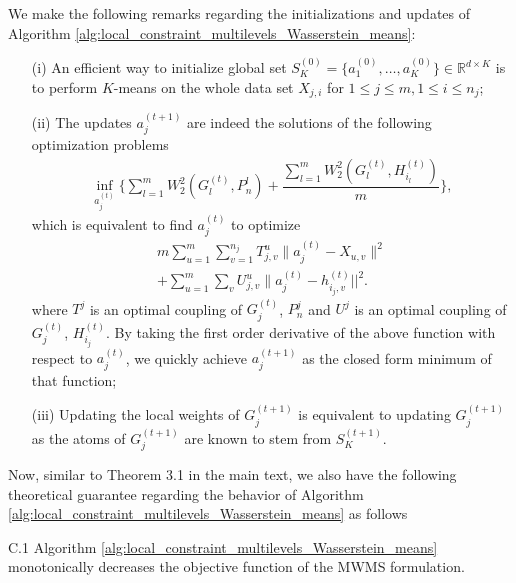 We make the following remarks regarding the initializations and updates of Algorithm \ref{alg:local_constraint_multilevels_Wasserstein_means}: 
\begin{itemize}
\item[(i)] An efficient way to 
initialize global set $S_{K}^{(0)}=\biggr\{a_{1}^{(0)},\ldots,a_{K}^{(0)}\biggr\} \in 
\mathbb{R}^{d \times K}$ is to perform $K$-means on the whole data set $X_{j,i}$ for $1 
\leq j \leq m, 1 \leq i \leq n_{j}$; 
\item[(ii)] The updates $a_{j}^{(t+1)}$ are indeed the solutions 
of the following optimization problems
\begin{eqnarray}
\inf \limits_{a_{j}^{(t)}}\biggr\{\sum \limits_{l=1}^{m}{W_{2}^{2}(G_{l}^{(t)},P_{n}^{l})}+\dfrac{\sum \limits_{l=1}^{m}{W_{2}^{2}(G_{l}^{(t)},H_{i_{l}}^{(t)})}}{m}\biggr\}, \nonumber
\end{eqnarray}
which is equivalent to find $a_{j}^{(t)}$ to optimize 
\begin{eqnarray}
m \sum \limits_{u=1}^{m}{\sum \limits_{v=1}^{n_{j}}{T_{j,v}^{u}\|a_{j}^{(t)}-X_{u,v}\|^{2}}} \nonumber \\
+\sum \limits_{u=1}^{m}{\sum \limits_{v}{U_{j,v}^{u}\|a_{j}^{(t)}-h_{i_{j},v}^{(t)}||^{2}}}.\nonumber
\end{eqnarray}
where $T^{j}$ is an optimal coupling of $G_{j}^{(t)}$, $P_{n}^{j}$ and $U^{j}$ is an optimal coupling of $G_{j}^{(t)}$, $H_{i_{j}}^{(t)}$. By taking the first order derivative of the above function with respect to $a_{j}^{(t)}$, we quickly achieve $a_{j}^{(t+1)}$ as the closed form minimum of that function;
\item[(iii)] Updating the local weights of $G_{j}^{(t+1)}$ is equivalent to updating $G_{j}^{(t+1)}$ as 
the atoms of $G_{j}^{(t+1)}$ are known to stem from $S_{K}^{(t+1)}$. 
\end{itemize}
Now, similar to 
Theorem 3.1 in the main text, we also have the following theoretical 
guarantee regarding the behavior of Algorithm \ref{alg:local_constraint_multilevels_Wasserstein_means} as follows
\begin{customthm}{C.1} \label{theorem:local_convergence_local_constraint_Kmeans} Algorithm 
\ref{alg:local_constraint_multilevels_Wasserstein_means} monotonically decreases the 
objective function of  
the MWMS formulation.
\end{customthm}
